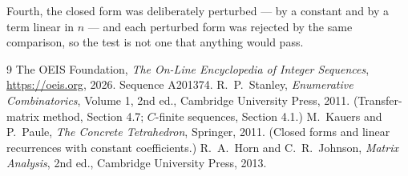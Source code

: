 \documentclass[11pt,a4paper]{article}
\theoremstyle{plain}
\theoremstyle{definition}
\begin{document}
Fourth, the closed form was deliberately perturbed --- by a constant and by a term linear in
$n$ --- and each perturbed form was rejected by the same comparison, so the test is not one
that anything would pass.

\begin{thebibliography}{9}
 The OEIS Foundation, \emph{The On-Line Encyclopedia of Integer
Sequences}, \url{https://oeis.org}, 2026. Sequence A201374.
 R.~P.~Stanley, \emph{Enumerative Combinatorics}, Volume 1, 2nd ed.,
Cambridge University Press, 2011. (Transfer-matrix method, Section 4.7; $C$-finite sequences,
Section 4.1.)
 M.~Kauers and P.~Paule, \emph{The Concrete Tetrahedron}, Springer, 2011.
(Closed forms and linear recurrences with constant coefficients.)
 R.~A.~Horn and C.~R.~Johnson, \emph{Matrix Analysis}, 2nd ed., Cambridge
University Press, 2013.
\end{thebibliography}
\end{document}
